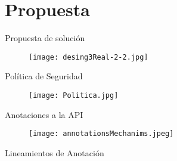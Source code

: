  \section{Propuesta}
	
\begin{frame}{Propuesta de solución}
	\begin{figure}[t!]
		\begin{center} 
		\texttt{[image: desing3Real-2-2.jpg]} 
		\end{center}
		\label{fig:desingReal}
	\end{figure}
\end{frame}

\begin{frame}{Política de Seguridad}
	\begin{figure}[t!]
		\begin{center} 
		\texttt{[image: Politica.jpg]} 
		\end{center}
		\label{fig:desingReal}
	\end{figure}
\end{frame}

\begin{frame}{Anotaciones a la API}
	\begin{figure}[t!]
		\begin{center} 
		\texttt{[image: annotationsMechanims.jpeg]} 
		\end{center}
		\label{fig:desingReal}
	\end{figure}
\end{frame}

\begin{frame}{Lineamientos de Anotación}
	
\end{frame}
